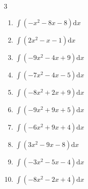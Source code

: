 \begin{multicols}{3}
\begin{enumerate}

\columnbreak %

\resetques

  \item $\displaystyle \int \left( -x^{2}-8x-8 \right) \mathrm{d}x$


  \item $\displaystyle \int \left( 2x^{2}-x-1 \right) \mathrm{d}x$


  \item $\displaystyle \int \left( -9x^{2}-4x+9 \right) \mathrm{d}x$


  \item $\displaystyle \int \left( -7x^{2}-4x-5 \right) \mathrm{d}x$


  \item $\displaystyle \int \left( -8x^{2}+2x+9 \right) \mathrm{d}x$


  \item $\displaystyle \int \left( -9x^{2}+9x+5 \right) \mathrm{d}x$


  \item $\displaystyle \int \left( -6x^{2}+9x+4 \right) \mathrm{d}x$


  \item $\displaystyle \int \left( 3x^{2}-9x-8 \right) \mathrm{d}x$


  \item $\displaystyle \int \left( -3x^{2}-5x-4 \right) \mathrm{d}x$


  \item $\displaystyle \int \left( -8x^{2}-2x+4 \right) \mathrm{d}x$


\end{enumerate}
\end{multicols}
